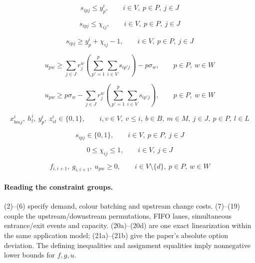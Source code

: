 \documentclass[10pt,a4paper]{article}
\begin{document}
\begin{equation}
s_{ipj} \le y_p^i,
\qquad i \in V,\ p \in P,\ j \in J
\tag{20b}
\end{equation}

\begin{equation}
s_{ipj} \le \chi_{ij},
\qquad i \in V,\ p \in P,\ j \in J
\tag{20c}
\end{equation}

\begin{equation}
s_{ipj} \ge y_p^i + \chi_{ij} - 1,
\qquad i \in V,\ p \in P,\ j \in J
\tag{20d}
\end{equation}

\begin{equation}
u_{pw}
\ge
\sum_{j \in J} r_j^w
\left(
\sum_{p'=1}^{p} \sum_{i \in V} s_{ip'j}
\right)
- p \sigma_w,
\qquad p \in P,\ w \in W
\tag{21a}
\end{equation}

\begin{equation}
u_{pw}
\ge
p \sigma_w
- \sum_{j \in J} r_j^w
\left(
\sum_{p'=1}^{p} \sum_{i \in V} s_{ip'j}
\right),
\qquad p \in P,\ w \in W
\tag{21b}
\end{equation}

\begin{equation}
x_{bmj}^i,\ h_l^i,\ y_p^i,\ z_{vl}^i \in \{0,1\},
\qquad
i,v \in V,\ v \le i,\ b \in B,\ m \in M,\ j \in J,\ p \in P,\ l \in L
\tag{22}
\end{equation}

\begin{equation}
s_{ipj} \in \{0,1\},
\qquad i \in V,\ p \in P,\ j \in J
\tag{23}
\end{equation}

\begin{equation}
0 \le \chi_{ij} \le 1,
\qquad i \in V,\ j \in J
\tag{24}
\end{equation}

\begin{equation}
f_{i,i+1},\ g_{i,i+1},\ u_{pw} \ge 0,
\qquad i \in V \setminus \{d\},\ p \in P,\ w \in W
\tag{25}
\end{equation}

\paragraph{Reading the constraint groups.}
(2)--(6) specify demand, colour batching and upstream change costs.
(7)--(19) couple the upstream/downstream permutations, FIFO lanes,
simultaneous entrance/exit events and capacity.
(20a)--(20d) are one exact linearization within the same application model;
(21a)--(21b) give the paper's absolute option deviation.
The defining inequalities and assignment equalities imply nonnegative lower bounds for $f,g,u$.
\end{document}

